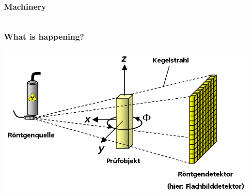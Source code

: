 \begin{frame}
	\frametitle{Machinery}
	\begin{columns}
		\begin{column}{0.49\linewidth}
			\centering
			
		\end{column}
		\begin{column}{0.49\linewidth}
			\centering
			\only<1>{}%
			\only<2|handout:0>{}%
			\only<3|handout:0>{}%
		\end{column}
	\end{columns}
\end{frame}

\begin{frame}
	\frametitle{What is happening?}
	\centering
	\includegraphics[height=0.618\textheight]{./images/3D_Computed_Tomography}
\end{frame}

